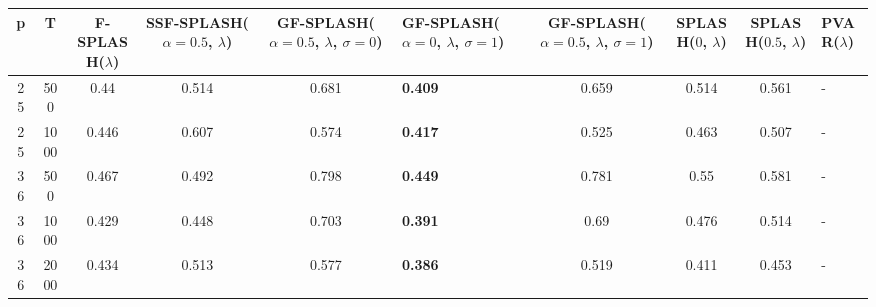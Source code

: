 \begin{tabular}{ccccclcccl}
\hline
  p  &  T   &  F-SPLASH($\lambda$)  &  SSF-SPLASH($\alpha=0.5$, $\lambda$)  &  GF-SPLASH($\alpha=0.5$, $\lambda$, $\sigma=0$)  & GF-SPLASH($\alpha=0$, $\lambda$, $\sigma=1$)   &  GF-SPLASH($\alpha=0.5$, $\lambda$, $\sigma=1$)  &  SPLASH($0$, $\lambda$)  &  SPLASH($0.5$, $\lambda$)  & PVAR($\lambda$)   \\
\hline
 25  & 500  &         0.44          &                 0.514                 &                      0.681                       & \textbf{0.409}                                 &                      0.659                       &          0.514           &           0.561            & -                 \\
 25  & 1000 &         0.446         &                 0.607                 &                      0.574                       & \textbf{0.417}                                 &                      0.525                       &          0.463           &           0.507            & -                 \\
 36  & 500  &         0.467         &                 0.492                 &                      0.798                       & \textbf{0.449}                                 &                      0.781                       &           0.55           &           0.581            & -                 \\
 36  & 1000 &         0.429         &                 0.448                 &                      0.703                       & \textbf{0.391}                                 &                       0.69                       &          0.476           &           0.514            & -                 \\
 36  & 2000 &         0.434         &                 0.513                 &                      0.577                       & \textbf{0.386}                                 &                      0.519                       &          0.411           &           0.453            & -                 \\
\hline
\end{tabular}